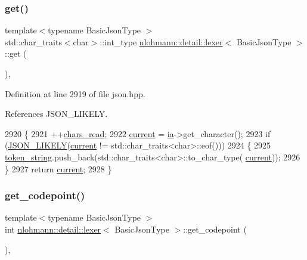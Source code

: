 \subsubsection{\texorpdfstring{get()}{get()}}
{\footnotesize\ttfamily template$<$typename Basic\+Json\+Type $>$ \\
std\+::char\+\_\+traits$<$char$>$\+::int\+\_\+type \hyperlink{classnlohmann_1_1detail_1_1lexer}{nlohmann\+::detail\+::lexer}$<$ Basic\+Json\+Type $>$\+::get (\begin{DoxyParamCaption}{ }\end{DoxyParamCaption})\hspace{0.3cm}{\ttfamily [inline]}, {\ttfamily [private]}}



Definition at line 2919 of file json.\+hpp.



References J\+S\+O\+N\+\_\+\+L\+I\+K\+E\+LY.


\begin{DoxyCode}
2920     \{
2921         ++\hyperlink{classnlohmann_1_1detail_1_1lexer_aab991bcbf230c372b276742f1790ba5b}{chars\_read};
2922         \hyperlink{classnlohmann_1_1detail_1_1lexer_a47169f9aaf0da4c9885e61d3109859aa}{current} = \hyperlink{classnlohmann_1_1detail_1_1lexer_aa7e69cd9d51451fd798eaf501b40421f}{ia}->get\_character();
2923         \textcolor{keywordflow}{if} (\hyperlink{json_8hpp_a41ecd1c4cf7c3d56477b9b685b5daa72}{JSON\_LIKELY}(\hyperlink{classnlohmann_1_1detail_1_1lexer_a47169f9aaf0da4c9885e61d3109859aa}{current} != std::char\_traits<char>::eof()))
2924         \{
2925             \hyperlink{classnlohmann_1_1detail_1_1lexer_ad2960e3d54af8fb8d572a8f6f7731d62}{token\_string}.push\_back(std::char\_traits<char>::to\_char\_type(
      \hyperlink{classnlohmann_1_1detail_1_1lexer_a47169f9aaf0da4c9885e61d3109859aa}{current}));
2926         \}
2927         \textcolor{keywordflow}{return} \hyperlink{classnlohmann_1_1detail_1_1lexer_a47169f9aaf0da4c9885e61d3109859aa}{current};
2928     \}
\end{DoxyCode}
\mbox{\label{classnlohmann_1_1detail_1_1lexer_a820b20e25ff255c3c791c37f2bf48380}} 
\subsubsection{\texorpdfstring{get\+\_\+codepoint()}{get\_codepoint()}}
{\footnotesize\ttfamily template$<$typename Basic\+Json\+Type $>$ \\
int \hyperlink{classnlohmann_1_1detail_1_1lexer}{nlohmann\+::detail\+::lexer}$<$ Basic\+Json\+Type $>$\+::get\+\_\+codepoint (\begin{DoxyParamCaption}{ }\end{DoxyParamCaption})\hspace{0.3cm}{\ttfamily [inline]}, {\ttfamily [private]}}



